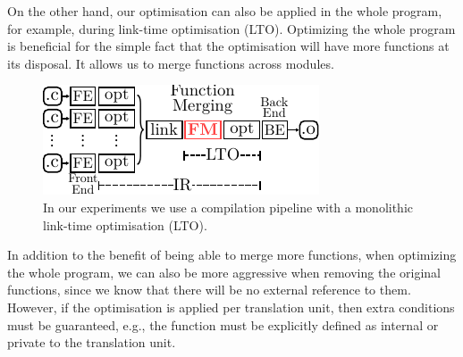 On the other hand, our optimisation can also be applied in the whole program,
for example, during link-time optimisation (LTO).
Optimizing the whole program is beneficial for the simple fact that the
optimisation will have more functions at its disposal.
It allows us to merge functions across modules.

\begin{figure}[h]
  \centering
  \includegraphics[width=0.7\linewidth]{src/merging-optimisation/figs/opt-pipeline.pdf}
  \caption{In our experiments we use a compilation pipeline with a monolithic link-time optimisation (LTO).}
  \label{fig:opt-pipeline}
\end{figure}


In addition to the benefit of being able to merge more functions, when optimizing
the whole program, we can also be more aggressive when removing the original functions,
since we know that there will be no external reference to them.
However, if the optimisation is applied per translation unit, then extra
conditions must be guaranteed, e.g., the function must be explicitly defined
as internal or private to the translation unit.
